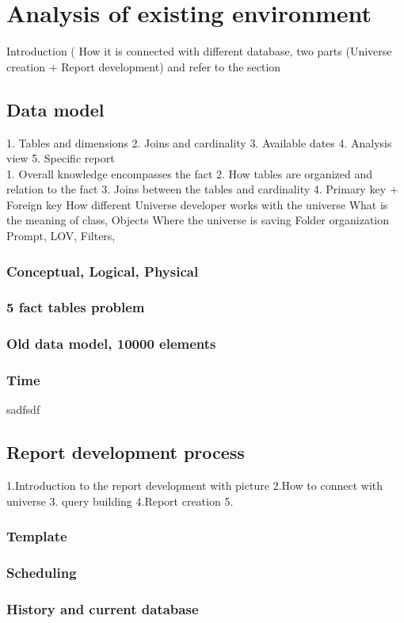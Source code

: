 \chapter{Analysis of existing environment}
Introduction ( How it is connected with different database, two parts (Universe creation + Report development) and refer to the section 
\section{Data model}
1. Tables and dimensions
2. Joins and  cardinality
3. Available dates
4. Analysis view
5. Specific report
\\


1. Overall knowledge encompasses the fact 
2. How tables are organized and relation to the fact
3. Joins between the tables and cardinality
4. Primary key + Foreign key
How different Universe developer works with the universe
What is the meaning of class, Objects
Where the universe is saving
Folder organization
Prompt, LOV, Filters, 

\subsection{Conceptual, Logical, Physical}
\subsection{5 fact tables problem}
\subsection{Old data model, 10000 elements}
\subsection{Time}
sadfsdf
\section{Report development process}
1.Introduction to the report development with picture
2.How to connect with universe
3. query building
4.Report creation
5.  
\subsection{Template}
\subsection{Scheduling}
\subsection{History and current database}
